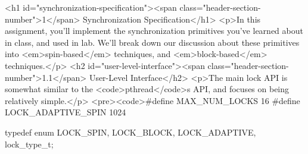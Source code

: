 \documentclass[]{}
\author{}
\date{}
\begin{document}


<h1 id="synchronization-specification"><span class="header-section-number">1</span> Synchronization Specification</h1>
<p>In this assignment, you'll implement the synchronization primitives you've learned about in class, and used in lab. We'll break down our discussion about these primitives into <em>spin-based</em> techniques, and <em>block-based</em> techniques.</p>
<h2 id="user-level-interface"><span class="header-section-number">1.1</span> User-Level Interface</h2>
<p>The main lock API is somewhat similar to the <code>pthread</code>s API, and focuses on being relatively simple.</p>
<pre><code>#define MAX_NUM_LOCKS 16
#define LOCK_ADAPTIVE_SPIN 1024

typedef enum {
    LOCK_SPIN,
    LOCK_BLOCK,
    LOCK_ADAPTIVE,
} lock_type_t;
\end{document}
